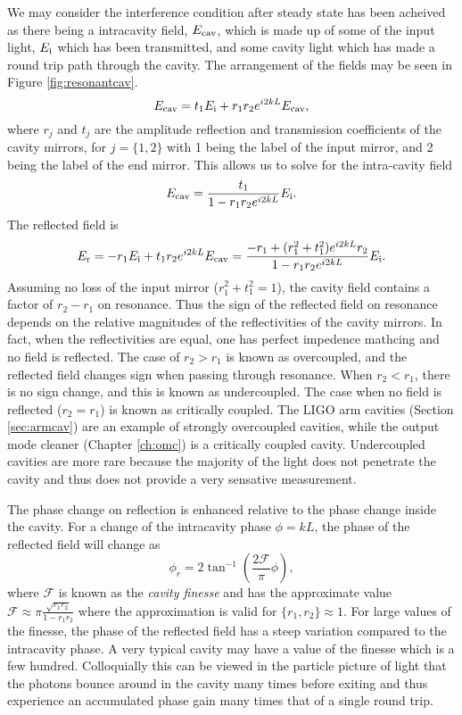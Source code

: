 We may consider the interference condition after steady state has been acheived as there being a intracavity field, $E_{\rm{cav}}$, which is made up of some of the input light, $E_{\rm i}$ which has been transmitted, and some cavity light which has made a round trip path through the cavity. %
The arrangement of the fields may be seen in Figure \ref{fig:resonantcav}.
\begin{equation}
E_{\rm{cav}}=t_1 E_{\rm i} + r_1 r_2 e^{i 2 k L} E_{\rm{cav}},
\end{equation}
where $r_j$ and $t_j$ are the amplitude reflection and transmission coefficients of the cavity mirrors, for $j=\{1,2\}$ with 1 being the label of the input mirror, and 2 being the label of the end mirror. %
This allows us to solve for the intra-cavity field
\begin{equation}
E_{\rm{cav}}=\frac{t_1}{1 - r_1 r_2 e^{i 2 k L}} E_{\rm i}.
\end{equation}
The reflected field is
\begin{equation}
E_{\rm{r}}=-r_1 E_{\rm i} + t_1r_2 e^{i 2 k L} E_{\rm{cav}}=\frac{-r_1+(r_1^2+t_1^2)e^{i2kL}r_2}{1-r_1r_2e^{i2kL}}E_{\rm i}.
\end{equation}
Assuming no loss of the input mirror ($r_1^2+t_1^2=1$), the cavity field contains a factor of $r_2-r_1$ on resonance. %
Thus the sign of the reflected field on resonance depends on the relative magnitudes of the reflectivities of the cavity mirrors. %
In fact, when the reflectivities are equal, one has perfect impedence mathcing and no field is reflected. %
The case of $r_2>r_1$ is known as overcoupled, and the reflected field changes sign when passing through resonance. %
When $r_2<r_1$, there is no sign change, and this is known as undercoupled. %
The case when no field is reflected ($r_2=r_1$) is known as critically coupled. %
The LIGO arm cavities (Section \ref{sec:armcav}) are an example of strongly overcoupled cavities, while the output mode cleaner (Chapter \ref{ch:omc}) is a critically coupled cavity. %
Undercoupled cavities are more rare because the majority of the light does not penetrate the cavity and thus does not provide a very sensative measurement.

The phase change on reflection is enhanced relative to the phase change inside the cavity. %
For a change of the intracavity phase $\phi = k L$, the phase of the reflected field will change as
\begin{equation}
\phi_r=2\tan^{-1}\left(\frac{2\mathcal{F}}{\pi}\phi\right),
\end{equation}
where $\mathcal{F}$ is known as the \emph{cavity finesse} and has the approximate value $\mathcal{F}\approx \pi\frac{\sqrt{r_1r_2}}{1-r_1r_2}$ where the approximation is valid for $\{r_1,r_2\}\approx 1$. %
For large values of the finesse, the phase of the reflected field has a steep variation compared to the intracavity phase. %
A very typical cavity may have a value of the finesse which is a few hundred. %
Colloquially this can be viewed in the particle picture of light that the photons bounce around in the cavity many times before exiting and thus experience an accumulated phase gain many times that of a single round trip.

